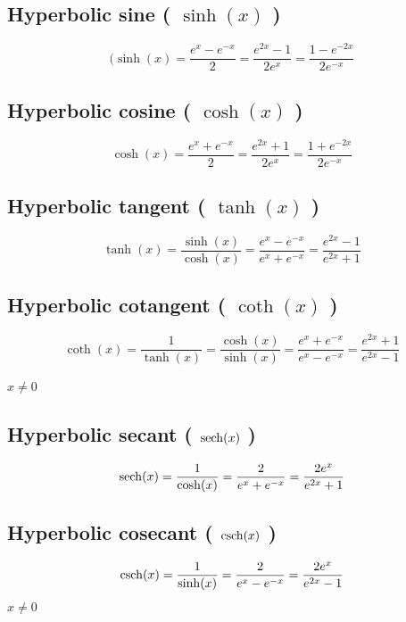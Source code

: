 \subsection{Hyperbolic sine ( $\sinh(x)$ ) }\label{Hyperbolic sine (sinh)}
\[
    (\sinh(x) = {\displaystyle\frac{e^{x} - e^{-x}}{2}}={\displaystyle\frac{e^{2x} - 1}{2e^{x}}}={\displaystyle\frac{1 - e^{-2x}}{2e^{-x}}}
\]

\subsection{Hyperbolic cosine ( $\cosh(x)$ ) }\label{Hyperbolic cosine (cosh)}
\[
    \cosh(x) = {\displaystyle\frac{e^{x} + e^{-x}}{2}} = {\displaystyle\frac{e^{2x} + 1}{2e^{x}}} = {\displaystyle\frac{1 + e^{-2x}}{2e^{-x}}}
\]

\subsection{Hyperbolic tangent ( $\tanh(x)$ )}\label{Hyperbolic tangent (tanh)}
\[
    \tanh(x) = \displaystyle\frac{\sinh(x)}{\cosh(x)} = \displaystyle\frac{e^{x} - e^{-x}}{e^{x} + e^{-x}} = \displaystyle\frac{e^{2x} - 1}{e^{2x} + 1}
\]

\subsection{Hyperbolic cotangent ( $\coth(x)$ )}\label{Hyperbolic cotangent (coth)}
\[
    \coth(x) = \displaystyle\frac{1}{\tanh(x)} = \displaystyle\frac{\cosh(x)}{\sinh(x)} = \displaystyle\frac{e^{x} + e^{-x}}{e^{x} - e^{-x}} = \displaystyle\frac{e^{2x} + 1}{e^{2x} - 1}
\]

$x \neq 0$

\subsection{Hyperbolic secant ( $\operatorname{sech}(x)$ )} \label{Hyperbolic secant (sech)}
\[
    \operatorname{sech}(x) = \displaystyle\frac{1}{\cosh(x)} = \displaystyle\frac{2}{e^{x} + e^{-x}} = \displaystyle\frac{2e^{x}}{e^{2x} + 1}
\]

\subsection{Hyperbolic cosecant ( $\operatorname{csch}(x)$ )}\label{Hyperbolic cosecant (csch)}
\[
    \operatorname{csch}(x) = \displaystyle\frac{1}{\sinh(x)} = \displaystyle\frac{2}{e^{x} - e^{-x}} = \displaystyle\frac{2e^{x}}{e^{2x} - 1}
\]
$x \neq 0$

